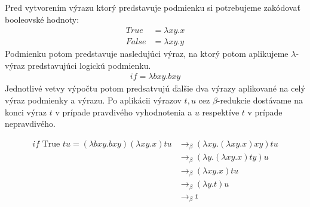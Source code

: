 \documentclass[a4paper,10pt,oneside]{report}%
\begin{document}
    Pred vytvorením výrazu ktorý predstavuje podmienku si potrebujeme zakódovať
booleovské hodnoty:
    \begin{align*}
        True &= \lambda x y . x \\
        False &= \lambda x y . y
    \end{align*}
    Podmienku potom predstavuje nasledujúci výraz, na ktorý potom aplikujeme $\lambda$-výraz
predstavujúci logickú podmienku.
\begin{align*}
    if = \lambda b x y . b x y
\end{align*}
    Jednotlivé vetvy výpočtu potom predsatvujú ďalšie dva výrazy aplikované na celý
výraz podmienky a výrazu.
    Po aplikácii výrazov $t,u$ cez $\beta$-redukcie dostávame na konci výraz $t$
v prípade pravdivého vyhodnotenia a $u$ respektíve $t$ v prípade nepravdivého.

\begin{align*}
    if \textrm{ True } t u = (\lambda bxy.bxy)(\lambda xy.x) t u & \to_{\beta} (\lambda xy.(\lambda xy.x)xy)tu \\
                                                     & \to_{\beta} (\lambda y.( \lambda xy.x)ty)u \\
                                                     & \to_{\beta} (\lambda xy.x)tu \\
                                                     & \to_{\beta} (\lambda y.t)u \\
                                                     & \to_{\beta} t
\end{align*}
\end{document}
